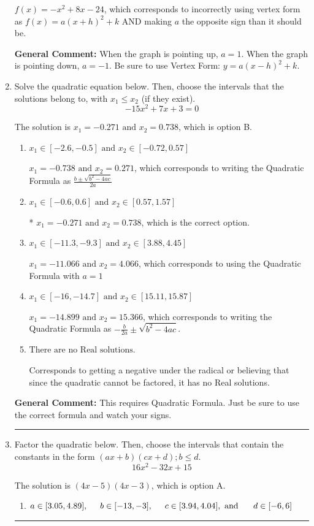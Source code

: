 \documentclass{extbook}[14pt]
\newcommand{\litem}[1]{\item #1

\rule{\textwidth}{0.4pt}}
\begin{document}
\begin{enumerate}
{\begin{enumerate}[label=\Alph*.]
$f(x)=-x^{2} +8 x -24$, which corresponds to incorrectly using vertex form as $f(x) = a(x+h)^2+k$ AND making $a$ the opposite sign than it should be.
\end{enumerate}

\textbf{General Comment:} When the graph is pointing up, $a=1$. When the graph is pointing down, $a=-1$. Be sure to use Vertex Form: $y = a(x-h)^2+k$.
}
\litem{
Solve the quadratic equation below. Then, choose the intervals that the solutions belong to, with $x_1 \leq x_2$ (if they exist).
\[ -15x^{2} +7 x + 3 = 0 \]

The solution is \( x_1 = -0.271 \text{ and } x_2 = 0.738 \), which is option B.\begin{enumerate}[label=\Alph*.]
\item \( x_1 \in [-2.6, -0.5] \text{ and } x_2 \in [-0.72, 0.57] \)

 $x_1 = -0.738 \text{ and } x_2 = 0.271$, which corresponds to writing the Quadratic Formula as $\frac{b \pm \sqrt{b^2 - 4ac}}{2a}$
\item \( x_1 \in [-0.6, 0.6] \text{ and } x_2 \in [0.57, 1.57] \)

* $x_1 = -0.271 \text{ and } x_2 = 0.738$, which is the correct option.
\item \( x_1 \in [-11.3, -9.3] \text{ and } x_2 \in [3.88, 4.45] \)

 $x_1 = -11.066 \text{ and } x_2 = 4.066$, which corresponds to using the Quadratic Formula with $a=1$
\item \( x_1 \in [-16, -14.7] \text{ and } x_2 \in [15.11, 15.87] \)

 $x_1 = -14.899 \text{ and } x_2 = 15.366$, which corresponds to writing the Quadratic Formula as $-\frac{b}{2a} \pm \sqrt{b^2 - 4ac}$.
\item \( \text{There are no Real solutions.} \)

Corresponds to getting a negative under the radical or believing that since the quadratic cannot be factored, it has no Real solutions.
\end{enumerate}

\textbf{General Comment:} This requires Quadratic Formula. Just be sure to use the correct formula and watch your signs.
}
\litem{
Factor the quadratic below. Then, choose the intervals that contain the constants in the form $(ax+b)(cx+d); b \leq d.$
\[ 16x^{2} -32 x + 15 \]

The solution is \( (4x -5)(4x -3) \), which is option A.\begin{enumerate}[label=\Alph*.]
\item \( a \in [3.05, 4.89], \hspace*{5mm} b \in [-13, -3], \hspace*{5mm} c \in [3.94, 4.04], \text{ and } \hspace*{5mm} d \in [-6, 6] \)


\end{enumerate}}
\end{enumerate}
\end{document}
